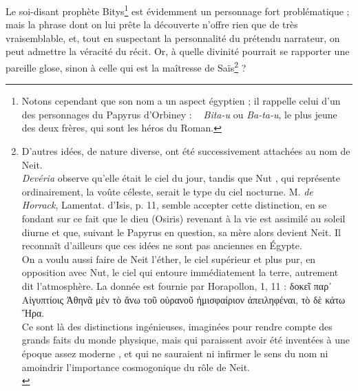 \documentclass[letterpaper,twocolumn,openany,nodeprecatedcode]{dndbook}
\newcommand*\hieroAADM{}
\newcommand*\hieroAADT{}
\newcommand*\hieroABGF{}
\newcommand*\hieroABIQ{\raisebox{0.5ex}{}}
\begin{document}
Le soi-disant prophète Bitys\footnote{Notons cependant que son nom a un aspect égyptien ; il rappelle celui d'un des personnages du Papyrus d'Orbiney : $\hieroAADM\:\hieroABIQ\:\hieroAADT$ \emph{Bita-u} ou \emph{Ba-ta-u}, le plus jeune des deux frères, qui sont les héros du Roman.} est évidemment un personnage fort problématique ; mais la phrase dont on lui prête la découverte n'offre rien que de très vraisemblable, et, tout en suspectant la personnalité du prétendu narrateur, on peut admettre la véracité du récit. Or, à quelle divinité pourrait se rapporter une pareille glose, sinon à celle qui est la maîtresse de Saïs\footnote{D'autres idées, de nature diverse, ont été successivement attachées au nom de Neit.\\\hspace*{5mm}\emph{Devéria} observe qu'elle était le ciel du jour, tandis que Nut $\hieroABGF$, qui représente ordinairement, la voûte céleste, serait le type du ciel nocturne. M. \emph{de Horrack}, Lamentat. d'Isis, p. 11, semble accepter cette distinction, en se fondant sur ce fait que le dieu (Osiris) revenant à la vie est assimilé au soleil diurne et que, suivant le Papyrus en question, sa mère alors devient Neit. Il reconnaît d'ailleurs que ces idées ne sont pas anciennes en Égypte.\\\hspace*{5mm}On a voulu aussi faire de Neit l'éther, le ciel supérieur et plus pur, en opposition avec Nut, le ciel qui entoure immédiatement la terre, autrement dit l'atmosphère. La donnée est fournie par Horapollon, 1, 11 : δοκεῖ παρ᾿ Αἰγυπτίοις Ἀθηνᾶ μὲν τὸ ἄνω τοῦ οὐρανοῦ ἡμισφαίριον ἀπειληφέναι, τὸ δὲ κάτω Ἥρα.\\\hspace*{5mm}Ce sont là des distinctions ingénieuses, imaginées pour rendre compte des grands faits du monde physique, mais qui paraissent avoir été inventées à une époque assez moderne , et qui ne sauraient ni infirmer le sens du nom ni amoindrir l'importance cosmogonique du rôle de Neit.\\\hspace*{5mm}} ?
\end{document}
